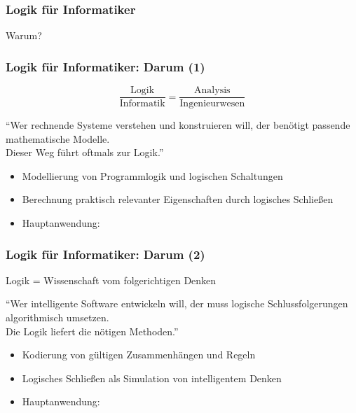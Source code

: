 \documentclass[onlymath]{beamer}
\begin{document}
% 
% 
% 



\begin{frame}\frametitle{Logik für Informatiker}

\pause
\begin{center}
\Huge Warum?
\end{center}

\end{frame}

\begin{frame}\frametitle{Logik für Informatiker: Darum (1)}

\begin{center}
\LARGE 
\[ \frac{\text{Logik}}{\text{Informatik}} = \frac{\text{Analysis}}{\text{Ingenieurwesen}}\]

\bigskip
\large
"`Wer rechnende Systeme verstehen und konstruieren will, der benötigt passende mathematische Modelle.\\Dieser Weg führt oftmals zur Logik."'
\end{center}


\begin{itemize}
\item Modellierung von Programm\alert{logik} und \alert{logischen} Schaltungen
\item Berechnung praktisch relevanter Eigenschaften durch logisches Schließen
\item Hauptanwendung: 
\end{itemize}

\end{frame}

\begin{frame}\frametitle{Logik für Informatiker: Darum (2)}

\begin{center}
\LARGE 
Logik = Wissenschaft vom folgerichtigen Denken

\bigskip
\large
"`Wer intelligente Software entwickeln will, der muss logische Schlussfolgerungen algorithmisch umsetzen.\\
Die Logik liefert die nötigen Methoden."'
\end{center}


\begin{itemize}
\item Kodierung von gültigen Zusammenhängen und Regeln
\item Logisches Schließen als Simulation von intelligentem Denken
\item Hauptanwendung: 
\end{itemize}

\end{frame}
\end{document}
